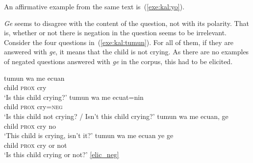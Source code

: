 \documentclass[output=paper,colorlinks,citecolor=brown,draft]{langscibook}
\begin{document}
\begin{xlist}

\end{xlist}
\z   

An affirmative example from the same text is~(\ref{exe:kal:yo}).

\ea	\label{exe:kal:yo}
\begin{xlist}

\end{xlist}
\z 

\textit{Ge} seems to disagree with the content of the question, not with its polarity. That is, whether or not there is negation in the question seems to be irrelevant. Consider the four questions in~(\ref{exe:kal:tumun}). For all of them, if they are answered with \textit{ge}, it means that the child is not crying. As there are no examples of negated questions answered with \textit{ge} in the corpus, this had to be elicited.

\ea \label{exe:kal:tumun}
\begin{xlist}
    \ex\label{exe:kal:tumun:a}
        \gll tumun wa me ecuan\\
        child \textsc{prox} {\glme} cry\\
        \glt `Is this child crying?'
    \ex\label{exe:kal:tumun:b}
        \gll tumun wa me ecuat=nin\\
        child \textsc{prox} {\glme} cry=\textsc{neg}\\
        \glt `Is this child not crying? / Isn't this child crying?' 
    \ex\label{exe:kal:tumun:c}
        \gll tumun wa me ecuan, ge\\
        child \textsc{prox} {\glme} cry no\\
        \glt `This child is crying, isn't it?'
    \ex\label{exe:kal:tumun:d}
        \gll tumun wa me ecuan ye ge\\
        child \textsc{prox} {\glme} cry or not\\
        \glt `Is this child crying or not?' {\href{http://hdl.handle.net/10050/00-0000-0000-0004-1C60-A}{[elic\_neg]}}
\end{xlist}
\z
\end{document}
